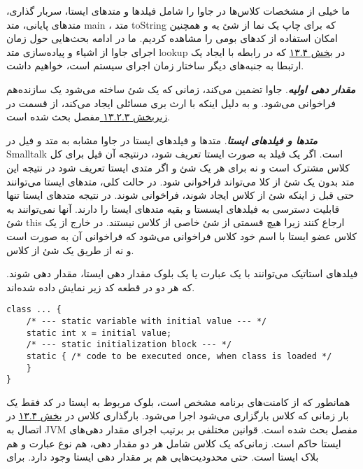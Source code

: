 \documentclass[a4paper,12pt]{report}
\newcommand{\lrInlineMono}[1]{{\color{steelBlue}\lr{\texttt{#1}}}}
\begin{document}
	ما خیلی از مشخصات کلاس‌ها در جاوا را شامل فیلد‌ها و متدهای ایستا،  سربار گذاری، متد‌های پایانی، متد main ، متد toString که برای چاپ یک نما از شئ یه و همچنین امکان استفاده از کد‌های بومی را مشاهده کردیم. ما در ادامه بحث‌هایی حول زمان اجرای جاوا از اشیاء و پیاده‌سازی متد lookup در 
	\hyperref[sec4:chap13]{
	بخش ۱۳.۴} که در رابطه با ایجاد یک ارتبطا به جنبه‌های دیگر ساختار زمان اجرای سیستم است، خواهیم داشت.

	\textbf{\textit{
	مقدار دهی اولیه}}. جاوا تضمین می‌کند، زمانی که یک شئ ساخته می‌شود یک سازنده‌هم فراخوانی می‌شود.
	و به دلیل اینکه با ارث ‌بری مسائلی ایجاد می‌کند، از قسمت در 
	\hyperref[subsec3:sec2:chap13]{
	زیربخش ۱۳.۲.۳ } مفصل بحث شده است.
	
	\textit{\textbf{
	متد‌ها و فیلد‌های ایستا}}. متد‌ها و فیلد‌های ایستا در جاوا مشابه به متد و فیل در Smalltalk است. اگر یک فیلد به صورت ایستا تعریف شود، درنتیجه آن فیل برای کل کلاس مشترک است و نه برای هر یک شئ و اگر متدی ایستا تعریف شود در نتیجه این متد بدون یک شئ از کلا می‌تواند فراخوانی شود. در حالت کلی، متد‌های ایستا می‌توانند حتی قبل ز اینکه  شئ از کلاس ایجاد شوند، فراخوانی شوند. در نتیجه متد‌های ایستا تنها قابلیت دسترسی به فیلد‌های ایسستا و بقیه متد‌های ایستا را دارند. آنها نمی‌توانند به شئ this ارجاع کنند زیرا هیچ قسمتی از شئ خاصی از کلاس نیستند. در خارج از یک کلاس عضو ایستا با اسم خود کلاس فراخوانی می‌شود که فراخوانی آن به صورت 
	\lrInlineMono{class\_name.static\_method(args)}
	است و نه از طریق یک شئ از کلاس.
	
	فیلد‌های استاتیک می‌توانند با یک عبارت یا یک بلوک مقدار ‌دهی ایستا، مقدار دهی شوند. که هر دو در قطعه کد زیر نمایش داده شده‌اند.
	
	\begin{latin}
		\small
		\begin{lstlisting}[]
class ... {
	/* --- static variable with initial value --- */
	static int x = initial value;
	/* --- static initialization block --- */
	static { /* code to be executed once, when class is loaded */
	}
}
		\end{lstlisting}
	\end{latin}	
	
	همانطور که از کامنت‌های برنامه مشخص است، بلوک مربوط به ایستا در کد فقط یک بار زمانی که کلاس بارگزاری می‌شود اجرا می‌شود. بارگذاری کلاس در 
	\hyperref[sec4:chap13]{
		بخش ۱۳.۴} در اتصال به JVM مفصل بحث شده است. قوانین مختلفی بر برتیب اجرای مقدار دهی‌های ایستا حاکم است. زمانی‌که یک کلاس شامل هر دو مقدار دهی، هم نوع عبارت و هم بلاک ایستا است. حتی محدودیت‌هایی هم بر مقدار دهی ایستا وجود دارد. برای     
	
\end{document}
